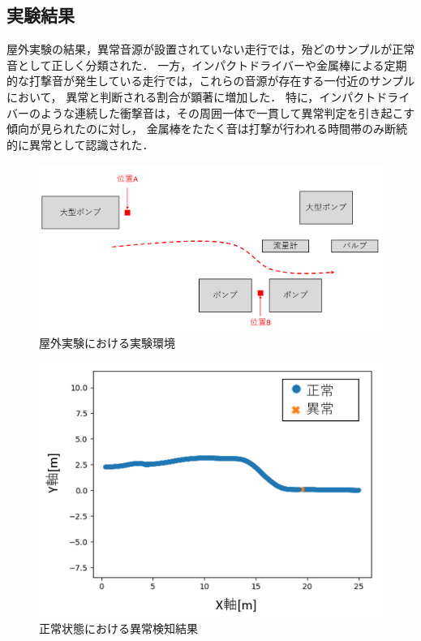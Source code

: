 \documentclass[../main]{subfiles}
\begin{document}
\subsection{実験結果}
\label{subsec:vexp_ci_result}
屋外実験の結果，異常音源が設置されていない走行では，殆どのサンプルが正常音として正しく分類された．
一方，インパクトドライバーや金属棒による定期的な打撃音が発生している走行では，これらの音源が存在する一付近のサンプルにおいて，
異常と判断される割合が顕著に増加した．
特に，インパクトドライバーのような連続した衝撃音は，その周囲一体で一貫して異常判定を引き起こす傾向が見られたのに対し，
金属棒をたたく音は打撃が行われる時間帯のみ断続的に異常として認識された．

\begin{figure}[t]
  \centering
  \includegraphics[keepaspectratio, width=1.0\linewidth]{chap4/field_environment.png}
  \caption{屋外実験における実験環境}
  \label{fig:field_environment}
\end{figure}

\begin{figure}[t]
  \centering
  \includegraphics[keepaspectratio, width=0.7\linewidth]{chap4/field_normal.png}
  \caption{正常状態における異常検知結果}
  \label{fig:field_normal}
\end{figure}
\end{document}
